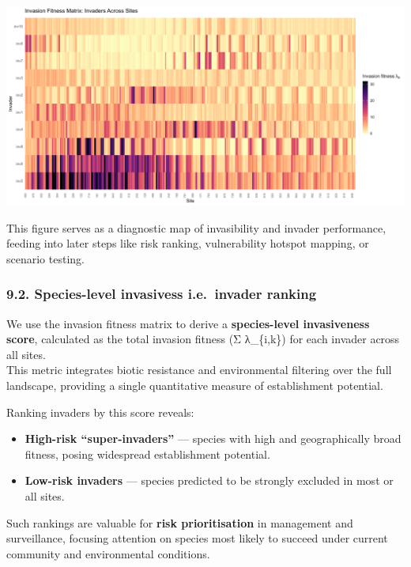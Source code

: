 \documentclass[
]{article}
\providecommand{\tightlist}{%
  \setlength{\itemsep}{0pt}\setlength{\parskip}{0pt}}
\begin{document}
\includegraphics[width=1\linewidth]{man/figures/README-plot-fitness-1}

This figure serves as a diagnostic map of invasibility and invader
performance, feeding into later steps like risk ranking, vulnerability
hotspot mapping, or scenario testing.

\hypertarget{species-level-invasivess-i.e.-invader-ranking}{%
\subsubsection{9.2. Species-level invasivess i.e.~invader
ranking}\label{species-level-invasivess-i.e.-invader-ranking}}

We use the invasion fitness matrix to derive a \textbf{species-level
invasiveness score}, calculated as the total invasion fitness (Σ
λ\_\{i,k\}) for each invader across all sites.\\
This metric integrates biotic resistance and environmental filtering
over the full landscape, providing a single quantitative measure of
establishment potential.

Ranking invaders by this score reveals:

\begin{itemize}
\tightlist
\item
  \textbf{High-risk ``super-invaders''} --- species with high and
  geographically broad fitness, posing widespread establishment
  potential.\\
\item
  \textbf{Low-risk invaders} --- species predicted to be strongly
  excluded in most or all sites.
\end{itemize}

Such rankings are valuable for \textbf{risk prioritisation} in
management and surveillance, focusing attention on species most likely
to succeed under current community and environmental conditions.
\end{document}
